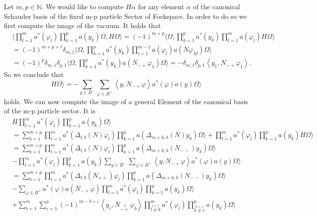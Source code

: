 \documentclass[oneside,reqno,12pt]{amsart}
\begin{document}
Let \(m,p\in\mathbb{N}\).  We would like to compute \(H\alpha\) for any element \(\alpha\) of the canonical Schauder basis of the fixed m-p particle Sector of Fockspace. In order to do so we first compute the image of the vacuum. It holds that
\begin{align*}
&\langle \prod_{l=1}^m a^*(\varphi_l) \prod_{k=1}^p a(y_k) \Omega, H  \Omega\rangle
=(-1)^{m+p} \langle \Omega, \prod_{k=1}^p a^*(y_k) \prod_{l=1}^m a(\varphi_l) H \Omega \rangle\\
&=(-1)^{m+p+1} \delta_{m,1}  \langle \Omega, \prod_{k=1}^p a^*(y_k) \prod_{l=1}^{m-1} a(\varphi_l)  a\left( N \varphi_M\right) \Omega \rangle\\
&=(-1)^{p} \delta_{m,1}\delta_{p,1}  \langle \Omega, \prod_{k=1}^p a^*(y_k)   a\left( N_{-+} \varphi_1\right) \Omega \rangle 
=-\delta_{m,1}\delta_{p,1} \left< y_1, N_{-+} \varphi_1\right>
.\end{align*}
So we conclude that
\begin{equation}
H \Omega \rangle= -\sum_{y\in B^-}\sum_{\varphi\in B^+} \left< y, N_{-+} \varphi\right> a^*(\varphi) a(y) \Omega\rangle
\end{equation}
holds. We can now compute the image of a general Element of the canonical basis of the m-p particle sector. It is
\begin{align*}
&H \prod_{l=1}^m a^*(\varphi_l) \prod_{k=1}^p a(y_k) \Omega \rangle\\
&=\sum_{b=1}^{m+p} \prod_{l=1}^m a^*\left(\Delta_{l,b}\left( N\right) \varphi_l \right)\prod_{k=1}^p a\left(\Delta_{m+k,b}\left(N\right) y_k \right) \Omega \rangle
+  \prod_{l=1}^m a^*(\varphi_l) \prod_{k=1}^p a(y_k) H \Omega \rangle\\
&=\sum_{b=1}^{m+p} \prod_{l=1}^m a^*\left(\Delta_{l,b}\left( N\right) \varphi_l \right)\prod_{k=1}^p a\left(\Delta_{m+k,b}\left(N_{--}\right) y_k \right) \Omega \rangle\\
&-  \prod_{l=1}^m a^*(\varphi_l) \prod_{k=1}^p a(y_k) \sum_{y\in B^-}\sum_{\varphi\in B^+} \left< y, N_{-+} \varphi\right> a^*(\varphi) a(y) \Omega\rangle\\\tag{H1}\label{H1}
&=\sum_{b=1}^{m+p} \prod_{l=1}^m a^*\left(\Delta_{l,b}\left( N_{++}\right) \varphi_l \right)\prod_{k=1}^p a\left(\Delta_{m+k,b}\left(N_{--}\right) y_k \right) \Omega \rangle\\\tag{H2}\label{H2}
&- \sum_{\varphi\in B^+}  a^*(\varphi) a\left(N_{-+} \varphi\right) \prod_{l=1}^m a^*(\varphi_l) \prod_{k=1}^p a(y_k)  \Omega\rangle\\\tag{H3}\label{H3}
&+\sum_{b=1}^m \sum_{c=1}^p (-1)^{m-b +c}\left< y_c, N_{\stackrel{2}{-+}}\varphi_b\right>\prod_{\stackrel{l=1}{l\neq b}}^m a^*(\varphi_l) \prod_{\stackrel{k=1}{k\neq c}}^p a(y_k) \Omega \rangle
\end{align*}
\end{document}
